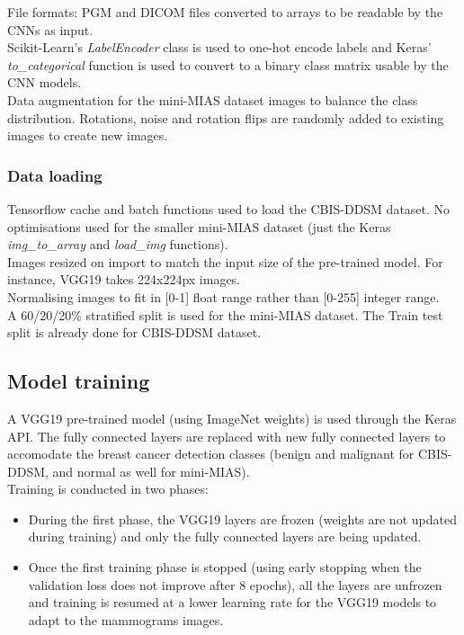 File formats: PGM and DICOM files converted to arrays to be readable by the CNNs as input.\\

Scikit-Learn's \textit{LabelEncoder} class is used to one-hot encode labels and Keras' \textit{to\_categorical}  function is used to convert to a binary class matrix usable by the CNN models.\\

Data augmentation for the mini-MIAS  dataset images to balance the class distribution. Rotations, noise and rotation flips are randomly added to existing images to create new images.

\subsubsection{Data loading}

Tensorflow cache and batch functions used to load the CBIS-DDSM dataset. No optimisations used for the smaller mini-MIAS dataset (just the Keras \textit{img\_to\_array} and \textit{load\_img} functions).\\

Images resized on import to match the input size of the pre-trained model. For instance, VGG19 takes 224x224px images.\\

Normalising images to fit in [0-1] float range rather than [0-255] integer range.\\

A 60/20/20\% stratified split is used for the mini-MIAS dataset. The Train test split is already done for CBIS-DDSM dataset.


\subsection{Model training}

A VGG19 pre-trained model (using ImageNet weights) is used through the Keras API. The fully connected layers are replaced with new fully connected layers  to accomodate the breast cancer detection classes (benign and malignant for CBIS-DDSM, and normal as well for mini-MIAS).\\

Training is conducted in two phases:
\begin{itemize}
    \item During the first phase, the VGG19 layers are frozen (weights are not updated during training) and only the fully connected layers are being updated.
    \item Once the first training phase is stopped (using early stopping when the validation loss does not improve after 8 epochs), all the layers are unfrozen and training is resumed at a lower learning rate for the VGG19 models to adapt to the mammograms images.
\end{itemize}

